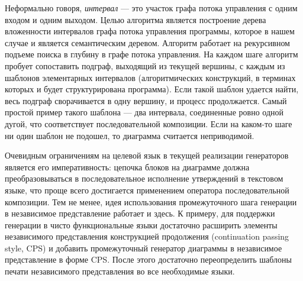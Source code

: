 \documentclass[conference]{IEEEtran}
\begin{document}
Неформально говоря, \textit{интервал} --- это участок графа потока управления с одним входом и одним выходом. Целью алгоритма является построение дерева вложенности интервалов графа потока управления программы, которое в нашем случае и является семантическим деревом. Алгоритм работает на рекурсивном подъеме поиска в глубину в графе потока управления. На каждом шаге алгоритм пробует сопоставить подграф, выходящий из текущей вершины, с каждым из шаблонов элементарных интервалов (алгоритмических конструкций, в терминах которых и будет структурирована программа). Если такой шаблон удается найти, весь подграф сворачивается в одну вершину, и процесс продолжается. Самый простой пример такого шаблона --- два интервала, соединенные ровно одной дугой, что соответствует последовательной композиции. Если на каком-то шаге ни один шаблон не подошел, то диаграмма считается неприводимой.

Очевидным ограничениям на целевой язык в текущей реализации генераторов является его императивность: цепочка блоков на диаграмме должна преобразовываться в последовательное исполнение утверждений в текстовом языке, что проще всего достигается применением оператора последовательной композиции. Тем не менее, идея использования промежуточного шага генерации в независимое представление работает и здесь. К примеру, для поддержки генерации в чисто функциональные языки достаточно расширить элементы независимого представления конструкцией продолжения (continuation passing style, CPS) и добавить промежуточный генератор диаграммы в независимое представление в форме CPS. После этого достаточно переопределить шаблоны печати независимого представления во все необходимые языки.
\end{document}
